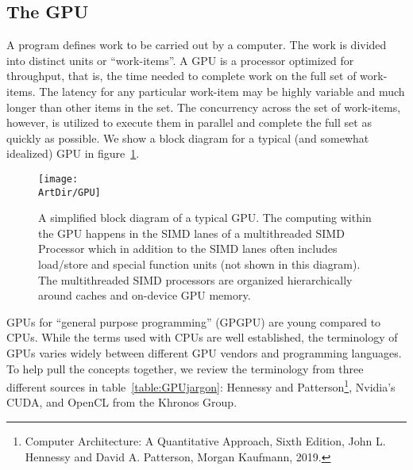 \subsection{The GPU}

A program defines work to be carried out by a computer.  The work is divided into distinct units or ``work-items''.  A GPU
is a processor optimized for throughput, that is, the time needed to complete work on the full set of work-items.
The latency for any particular work-item may be highly variable and much longer than other items in the set.
The concurrency across the set of work-items, however, is utilized to execute them in parallel and complete the 
full set as quickly as possible.  We show a block diagram for a typical (and somewhat idealized) 
GPU in figure~\ref{figure:GPU}.

\begin{figure}[!htbp]
\centerline{\texttt{[image: \\ArtDir/GPU]}}
\caption{A simplified block diagram of a typical GPU.  The computing within the GPU happens in the
SIMD lanes of a multithreaded SIMD Processor which in addition to the SIMD lanes often includes
load/store and special function units (not shown in this diagram).   The multithreaded SIMD processors
are organized hierarchically around caches and on-device GPU memory.}
\label{figure:GPU}
\end{figure}

GPUs for ``general purpose programming'' (GPGPU) are young compared to CPUs.  
While the terms used with CPUs are well established,
the terminology of GPUs varies widely between different GPU vendors and programming
languages.  To help pull the concepts together, we review the terminology from three
different sources in table~\ref{table:GPUjargon}: Hennessy and 
Patterson\footnote{Computer Architecture: A Quantitative Approach, Sixth Edition, 
John L. Hennessy and David A. Patterson, Morgan Kaufmann, 2019.}, Nvidia's CUDA, 
and OpenCL from the Khronos Group.

